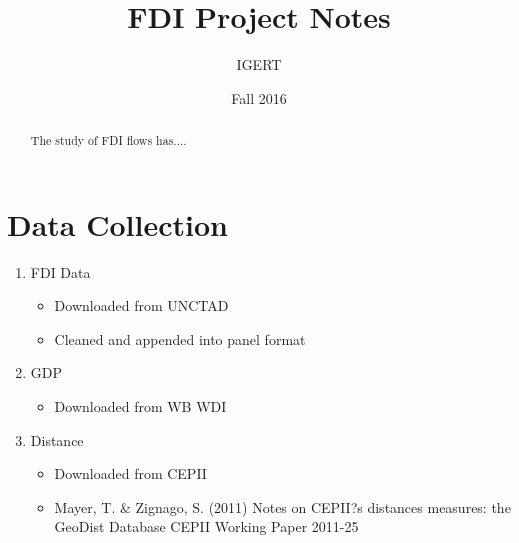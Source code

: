 \documentclass{article}
\begin{document}
\title{FDI Project Notes}
\author{IGERT}
\date{Fall 2016}
\maketitle

\singlespacing
\begin{abstract} 
    \noindent The study of FDI flows has....

\end{abstract}

\doublespacing

\section{Data Collection}



\begin{enumerate}
	\item {FDI Data}
		\begin{itemize}
			\item{Downloaded from UNCTAD}
			\item{Cleaned and appended into panel format}
		\end{itemize}
	\item {GDP}
		\begin{itemize}
			\item{Downloaded from WB WDI}
		\end{itemize}
	\item {Distance}
		\begin{itemize}
			\item{Downloaded from CEPII}
			\item{Mayer, T. \& Zignago, S. (2011) Notes on CEPII?s distances measures: the GeoDist Database
					CEPII Working Paper 2011-25}
		\end{itemize}
		
\end{enumerate}
\end{document}
